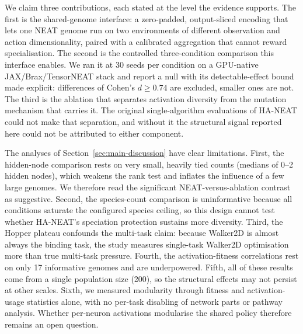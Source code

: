 \documentclass[12pt]{article}
\begin{document}
We claim three contributions, each stated at the level the evidence supports.
The first is the shared-genome interface: a zero-padded, output-sliced encoding that lets one NEAT genome run on two environments of different observation and action dimensionality, paired with a calibrated aggregation that cannot reward specialisation.
The second is the controlled three-condition comparison this interface enables. We ran it at 30 seeds per condition on a GPU-native JAX/Brax/TensorNEAT stack and report a null with its detectable-effect bound made explicit: differences of Cohen's $d \geq 0.74$ are excluded, smaller ones are not.
The third is the ablation that separates activation diversity from the mutation mechanism that carries it. The original single-algorithm evaluations of HA-NEAT could not make that separation, and without it the structural signal reported here could not be attributed to either component.

The analyses of Section~\ref{sec:main-discussion} have clear limitations.
First, the hidden-node comparison rests on very small, heavily tied counts (medians of 0--2 hidden nodes), which weakens the rank test and inflates the influence of a few large genomes. We therefore read the significant NEAT-versus-ablation contrast as suggestive.
Second, the species-count comparison is uninformative because all conditions saturate the configured species ceiling, so this design cannot test whether HA-NEAT's speciation protection sustains more diversity.
Third, the Hopper plateau confounds the multi-task claim: because Walker2D is almost always the binding task, the study measures single-task Walker2D optimisation more than true multi-task pressure.
Fourth, the activation-fitness correlations rest on only 17 informative genomes and are underpowered.
Fifth, all of these results come from a single population size (200), so the structural effects may not persist at other scales.
Sixth, we measured modularity through fitness and activation-usage statistics alone, with no per-task disabling of network parts or pathway analysis. Whether per-neuron activations modularise the shared policy therefore remains an open question.
\end{document}

